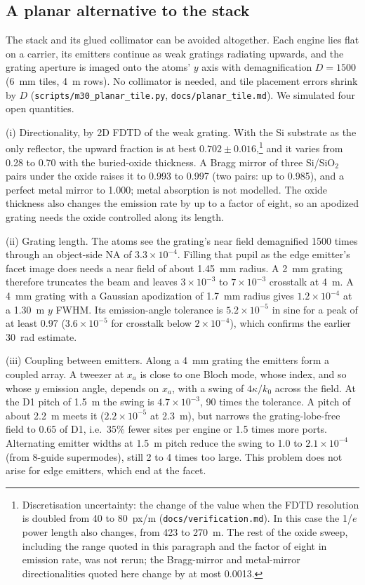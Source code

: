 \subsection{A planar alternative to the stack}\label{sec:combine-planar}

The stack and its glued collimator can be avoided altogether. Each engine lies flat on a carrier, its emitters continue as weak gratings radiating upwards, and the grating aperture is imaged onto the atoms' $y$ axis with demagnification $D=1500$ (6~mm tiles, 4~\textmu m rows). No collimator is needed, and tile placement errors shrink by $D$ (\texttt{scripts/\allowbreak m30\_planar\_tile.py}, \texttt{docs/\allowbreak planar\_tile.md}). We simulated four open quantities.

(i) Directionality, by 2D FDTD of the weak grating. With the Si substrate as the only reflector, the upward fraction is at best $0.702\pm0.016$,\footnote{Discretisation uncertainty: the change of the value when the FDTD resolution is doubled from 40 to 80~px/\textmu m (\texttt{docs/\allowbreak verification.md}). In this case the 1/$e$ power length also changes, from 423 to 270~\textmu m. The rest of the oxide sweep, including the range quoted in this paragraph and the factor of eight in emission rate, was not rerun; the Bragg-mirror and metal-mirror directionalities quoted here change by at most 0.0013.} and it varies from 0.28 to 0.70 with the buried-oxide thickness. A Bragg mirror of three Si/SiO$_2$ pairs under the oxide raises it to 0.993 to 0.997 (two pairs: up to 0.985), and a perfect metal mirror to 1.000; metal absorption is not modelled. The oxide thickness also changes the emission rate by up to a factor of eight, so an apodized grating needs the oxide controlled along its length.

(ii) Grating length. The atoms see the grating's near field demagnified 1500 times through an object-side NA of $3.3\times10^{-4}$. Filling that pupil as the edge emitter's facet image does needs a near field of about 1.45~mm radius. A 2~mm grating therefore truncates the beam and leaves $3\times10^{-3}$ to $7\times10^{-3}$ crosstalk at 4~\textmu m. A 4~mm grating with a Gaussian apodization of 1.7~mm radius gives $1.2\times10^{-4}$ at a 1.30~\textmu m $y$ FWHM. Its emission-angle tolerance is $5.2\times10^{-5}$ in sine for a peak of at least 0.97 ($3.6\times10^{-5}$ for crosstalk below $2\times10^{-4}$), which confirms the earlier 30~\textmu rad estimate.

(iii) Coupling between emitters. Along a 4~mm grating the emitters form a coupled array. A tweezer at $x_a$ is close to one Bloch mode, whose index, and so whose $y$ emission angle, depends on $x_a$, with a swing of $4\kappa/k_0$ across the field. At the D1 pitch of 1.5~\textmu m the swing is $4.7\times10^{-3}$, 90 times the tolerance. A pitch of about 2.2~\textmu m meets it ($2.2\times10^{-5}$ at 2.3~\textmu m), but narrows the grating-lobe-free field to 0.65 of D1, i.e.\ 35\% fewer sites per engine or 1.5 times more ports. Alternating emitter widths at 1.5~\textmu m pitch reduce the swing to 1.0 to $2.1\times10^{-4}$ (from 8-guide supermodes), still 2 to 4 times too large. This problem does not arise for edge emitters, which end at the facet.

